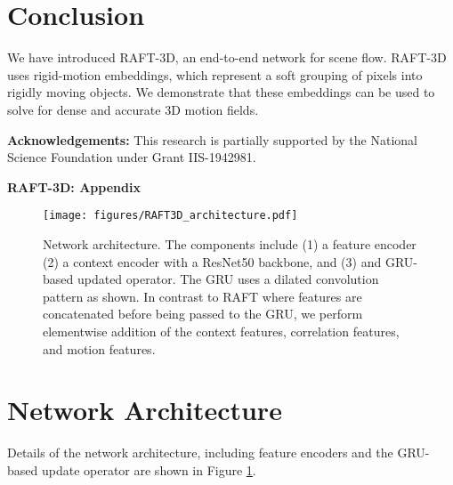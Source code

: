 \documentclass[final]{cvpr}
\begin{document}
\vspace{-5mm}
\section{Conclusion}
We have introduced RAFT-3D, an end-to-end network for scene flow. RAFT-3D uses rigid-motion embeddings, which represent a soft grouping of pixels into rigidly moving objects. We demonstrate that these embeddings can be used to solve for dense and accurate 3D motion fields.

\vspace{2mm} \noindent \textbf{Acknowledgements:} This research is partially supported by the National Science Foundation under Grant IIS-1942981.

{\small


}


\clearpage{}
















\appendix

\begin{center}
    \Large \textbf{RAFT-3D: Appendix}
\end{center}

\begin{figure}[h]
    \centering
    \texttt{[image: figures/RAFT3D\_architecture.pdf]}
    \caption{Network architecture. The components include (1) a feature encoder (2) a context encoder with a ResNet50 backbone, and (3) and GRU-based updated operator. The GRU uses a dilated convolution pattern as shown. In contrast to RAFT\cite{teed2020raft} where features are concatenated before being passed to the GRU, we perform elementwise addition of the context features, correlation features, and motion features.}
    \label{fig:architecture}
\end{figure}

\section{Network Architecture}

Details of the network architecture, including feature encoders and the GRU-based update operator are shown in Figure \ref{fig:architecture}.
\end{document}
